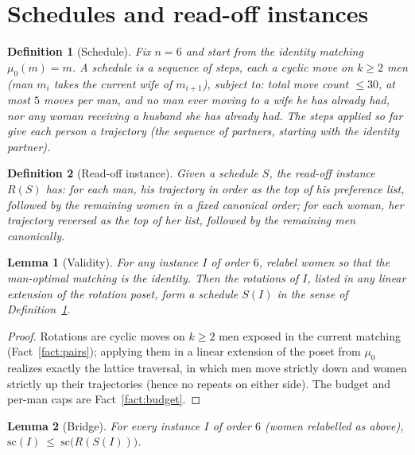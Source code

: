 \documentclass[11pt]{article}
\newtheorem{lemma}{Lemma}
\newtheorem{definition}{Definition}
\begin{document}
\section{Schedules and read-off instances}

\begin{definition}[Schedule]\label{def:sched}
Fix $n=6$ and start from the identity matching $\mu_0(m)=m$. A \emph{schedule} is a
sequence of \emph{steps}, each a cyclic move on $k\ge 2$ men (man $m_i$ takes the
current wife of $m_{i+1}$), subject to: total move count $\le 30$, at most $5$ moves
per man, and no man ever moving to a wife he has already had, nor any woman receiving a
husband she has already had. The steps applied so far give each person a
\emph{trajectory} (the sequence of partners, starting with the identity partner).
\end{definition}

\begin{definition}[Read-off instance]\label{def:readoff}
Given a schedule $S$, the read-off instance $R(S)$ has: for each man, his trajectory in
order as the top of his preference list, followed by the remaining women in a fixed
canonical order; for each woman, her trajectory \emph{reversed} as the top of her list,
followed by the remaining men canonically.
\end{definition}

\begin{lemma}[Validity]\label{lem:valid}
For any instance $I$ of order $6$, relabel women so that the man-optimal matching is the
identity. Then the rotations of $I$, listed in any linear extension of the rotation
poset, form a schedule $S(I)$ in the sense of Definition~\ref{def:sched}.
\end{lemma}

\begin{proof}
Rotations are cyclic moves on $k\ge2$ men exposed in the current matching
(Fact~\ref{fact:pairs}); applying them in a linear extension of the poset from $\mu_0$
realizes exactly the lattice traversal, in which men move strictly down and women
strictly up their trajectories (hence no repeats on either side). The budget and
per-man caps are Fact~\ref{fact:budget}.
\end{proof}

\begin{lemma}[Bridge]\label{lem:bridge}
For every instance $I$ of order $6$ (women relabelled as above),
$\mathrm{sc}(I)\ \le\ \mathrm{sc}\bigl(R(S(I))\bigr)$.
\end{lemma}
\end{document}
